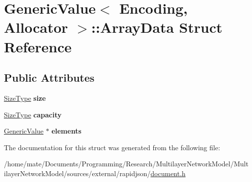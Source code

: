 \hypertarget{structGenericValue_1_1ArrayData}{}\section{Generic\+Value$<$ Encoding, Allocator $>$\+:\+:Array\+Data Struct Reference}
\label{structGenericValue_1_1ArrayData}
\subsection*{Public Attributes}
\begin{DoxyCompactItemize}
\item 
\hyperlink{rapidjson_8h_a5ed6e6e67250fadbd041127e6386dcb5}{Size\+Type} {\bfseries size}\hypertarget{structGenericValue_1_1ArrayData_a5306856f64aea8ec53abf263ed2a35e2}{}\label{structGenericValue_1_1ArrayData_a5306856f64aea8ec53abf263ed2a35e2}

\item 
\hyperlink{rapidjson_8h_a5ed6e6e67250fadbd041127e6386dcb5}{Size\+Type} {\bfseries capacity}\hypertarget{structGenericValue_1_1ArrayData_a0c6fe03c00e13d14b95abd31048aa1f5}{}\label{structGenericValue_1_1ArrayData_a0c6fe03c00e13d14b95abd31048aa1f5}

\item 
\hyperlink{classGenericValue}{Generic\+Value} $\ast$ {\bfseries elements}\hypertarget{structGenericValue_1_1ArrayData_a86df976cb6f65924aca20eb9bd35553e}{}\label{structGenericValue_1_1ArrayData_a86df976cb6f65924aca20eb9bd35553e}

\end{DoxyCompactItemize}


The documentation for this struct was generated from the following file\+:\begin{DoxyCompactItemize}
\item 
/home/mate/\+Documents/\+Programming/\+Research/\+Multilayer\+Network\+Model/\+Multilayer\+Network\+Model/sources/external/rapidjson/\hyperlink{document_8h}{document.\+h}\end{DoxyCompactItemize}
